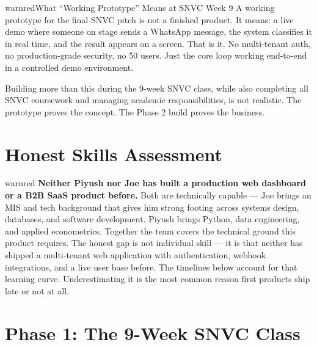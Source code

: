 \documentclass[12pt, a4paper]{article}
\begin{document}
\begin{callout}{warnred}{What ``Working Prototype'' Means at SNVC Week 9}
A working prototype for the final SNVC pitch is not a finished product.
It means: a live demo where someone on stage sends a WhatsApp message,
the system classifies it in real time, and the result appears on a screen.
That is it. No multi-tenant auth, no production-grade security, no 50 users.
Just the core loop working end-to-end in a controlled demo environment.

Building more than this during the 9-week SNVC class, while also completing
all SNVC coursework and managing academic responsibilities, is not realistic.
The prototype proves the concept. The Phase 2 build proves the business.
\end{callout}

\newpage

\section{Honest Skills Assessment}

\begin{plainbox}{warnred}
\textbf{Neither Piyush nor Joe has built a production web dashboard or
a B2B SaaS product before.} Both are technically capable --- Joe brings
an MIS and tech background that gives him strong footing across systems
design, databases, and software development. Piyush brings Python,
data engineering, and applied econometrics. Together the team covers
the technical ground this product requires. The honest gap is not
individual skill --- it is that neither has shipped a multi-tenant
web application with authentication, webhook integrations, and a live
user base before. The timelines below account for that learning curve.
Underestimating it is the most common reason first products ship late
or not at all.
\end{plainbox}

\newpage

\section{Phase 1: The 9-Week SNVC Class}
\end{document}
